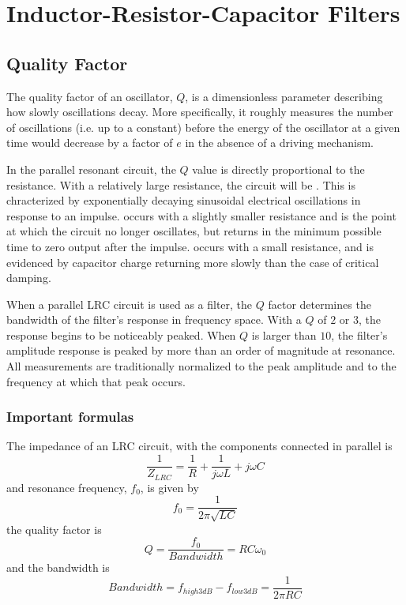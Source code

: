 \documentclass[12pt, a4paper, oneside, openright, titlepage]{book}
\begin{document}
\chapter{Inductor-Resistor-Capacitor Filters}

\section{Quality Factor}

The quality factor of an oscillator, $Q$, is a dimensionless parameter describing how slowly oscillations decay. More specifically, it roughly measures the number of oscillations (i.e. up to a constant) before the energy of the oscillator at a given time would decrease by a factor of $e$ in the absence of a driving mechanism. 

In the parallel resonant circuit, the $Q$ value is directly proportional to the resistance. With a relatively large resistance, the circuit will be . This is chracterized by exponentially decaying sinusoidal electrical oscillations in response to an impulse.  occurs with a slightly smaller resistance and is the point at which the circuit no longer oscillates, but returns in the minimum possible time to zero output after the impulse.  occurs with a small resistance, and is evidenced by capacitor charge returning more slowly than the case of critical damping.

When a parallel LRC circuit is used as a filter, the $Q$ factor determines the bandwidth of the filter's response in frequency space. With a $Q$ of $2$ or $3$, the response begins to be noticeably peaked. When $Q$ is larger than $10$, the filter's amplitude response is peaked by more than an order of magnitude at resonance. All measurements are traditionally normalized to the peak amplitude and to the frequency at which that peak occurs.

\subsection{Important formulas}

The impedance of an LRC circuit, with the components connected in parallel is \begin{equation*}
    \frac{1}{Z_{LRC}} = \frac{1}{R}  + \frac{1}{j\omega L} + j\omega C
\end{equation*}
and resonance frequency, $f_0$, is given by \begin{equation*}
    f_0 = \frac{1}{2\pi \sqrt{LC}}
\end{equation*}
the quality factor is \begin{equation*}
    Q = \frac{f_0}{Bandwidth} = RC\omega_0
\end{equation*}
and the bandwidth is \begin{equation*}
    Bandwidth = f_{high3dB} - f_{low3dB} = \frac{1}{2\pi RC}
\end{equation*}
\end{document}

